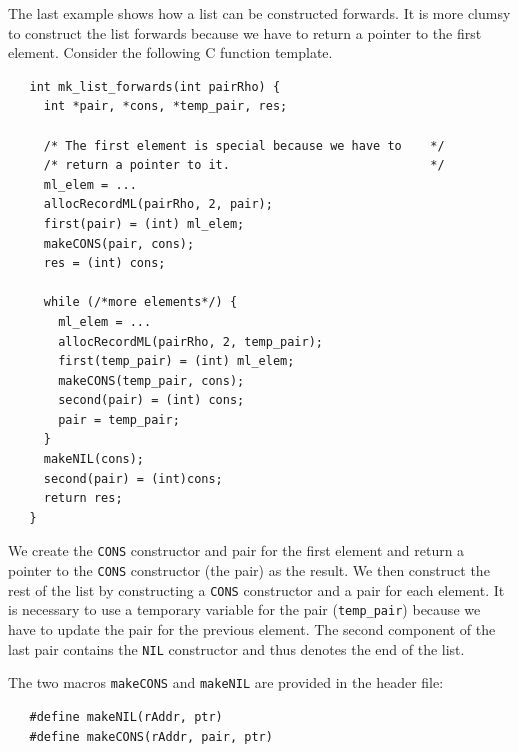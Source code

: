 \documentclass[12pt]{book}
\begin{document}
The last example shows how a list can be constructed forwards. It is more
clumsy to construct the list forwards because we have to return a pointer
to the first element. Consider the following C function template.
%
\begin{verbatim}
   int mk_list_forwards(int pairRho) {
     int *pair, *cons, *temp_pair, res;

     /* The first element is special because we have to    */
     /* return a pointer to it.                            */
     ml_elem = ...
     allocRecordML(pairRho, 2, pair);
     first(pair) = (int) ml_elem;
     makeCONS(pair, cons);
     res = (int) cons;

     while (/*more elements*/) {
       ml_elem = ...
       allocRecordML(pairRho, 2, temp_pair);
       first(temp_pair) = (int) ml_elem;
       makeCONS(temp_pair, cons);
       second(pair) = (int) cons;
       pair = temp_pair;
     }
     makeNIL(cons);
     second(pair) = (int)cons;
     return res;
   }
\end{verbatim}

We create the \texttt{CONS} constructor and pair for the first element
and return a pointer to the \texttt{CONS} constructor (the pair) as
the result. We then construct the rest of the list by constructing a
\texttt{CONS} constructor and a pair for each element. It is necessary
to use a temporary variable for the pair (\verb|temp_pair|) because we
have to update the pair for the previous element. The second component
of the last pair contains the \texttt{NIL} constructor and thus
denotes the end of the list.

The two macros \texttt{makeCONS} and \texttt{makeNIL} are provided in
the  header file:
%
%
\begin{verbatim}
   #define makeNIL(rAddr, ptr)
   #define makeCONS(rAddr, pair, ptr)
\end{verbatim}

\end{document}
